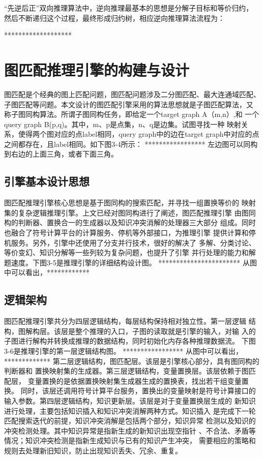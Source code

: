 \documentclass{standalone}
\begin{document}
“先逆后正”双向推理算法中，逆向推理最基本的思想是分解子目标和等价归约，
然后不断递归这个过程，最终形成归约树，相应逆向推理算法流程为：

*******************

\section{图匹配推理引擎的构建与设计}
图匹配是个经典的图上匹配问题，图匹配问题涉及二分图匹配、最大连通域匹配、
子图匹配等问题。本文设计的图匹配引擎采用的算法思想就是子图匹配算法，又
称子图同构算法。所谓子图同构任务，即给定一个target graph A（m,n）,和
一个query graph B(p,q)。其中，m、p是点集，n、q是边集。试图寻找一种
映射关系，使得两个图对应的点label相同，query graph中的边在target 
graph中对应的点之间都存在，且label相同。如下图3-4所示：
*****************
左边图可以同构到右边的上面三角，或者下面三角。
\subsection{引擎基本设计思想}
图匹配推理引擎核心思想是基于图同构的搜索匹配，并寻找一组置换等价的
映射集的复杂逻辑推理引擎。上文已经对图同构进行了阐述，图匹配推理引擎
由图同构的判断器、置换合一的生成器以及知识冲突消解的处理器三大部分
组成。同时也融合了符号计算平台的计算服务、停机等外部接口，为推理引擎
提供计算和停机服务。另外，引擎中还使用了分支并行技术，很好的解决了
多解、分类讨论、等价变幻、知识分解等一些列较为复杂问题，也提升了引擎
并行处理的能力和解题速度。下图3-5是推理引擎的详细结构设计图。
***********************
从图中可以看出，************

\subsection{逻辑架构}
图匹配推理引擎共分为四层逻辑结构，每层结构保持相对独立性。第一层逻辑
结构，图解构层。该层是整个推理的入口，子图的读取就是引擎的输入，对输
入的子图进行解构并转换成推理的数据结构，同时初始化内存各种推理数据流。
下图3-6是推理引擎的第一层逻辑结构图。
*****************
从图中可以看出，*************
第二层逻辑结构，图匹配层。该层是引擎核心部分，具有图同构的判断器和
置换映射集的生成器。第三层逻辑结构，变量置换层。该层依赖于图匹配层，
变量置换的是依据置换映射集生成器生成的置换表，找出若干组变量置换。
同时，该层还调用符号计算平台服务，置换出的变量映射是符号计算接口的
输入参数。第四层逻辑结构，知识更新层。该层是对于变量置换层生成的
新知识进行处理，主要包括知识插入和知识冲突消解两种方式。知识插入
是完成下一轮匹配搜索迭代的前提，知识冲突消解是包括两个部分，知识异常
检测以及知识的冲突检测处理。其中知识异常是指新生成的新知识出现空指针
、不合法、矛盾等情况；知识冲突检测是指新生成知识与已有的知识产生冲突，
需要相应的策略和规则去处理新旧知识，防止出现知识丢失、冗余、重复。
\end{document}

